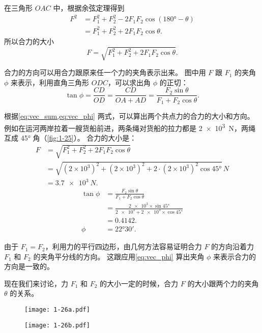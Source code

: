 在三角形 $OAC$ 中，根据余弦定理得到
\[\begin{split}
F^2 & = F_1^2+F_2^2-2F_1F_2\cos(\ang{180} -\theta)  \\
&= F_1^2+F_2^2+2F_1F_2\cos\theta.
\end{split} \]
所以合力的大小
\begin{equation}
  \label{eq:vec_sum}
F=\sqrt{F_1^2+F_2^2+2F_1F_2\cos\theta}.
\end{equation}

合力的方向可以用合力跟原来任一个力的夹角表示出来。
图中用 $F$ 跟 $F_1$ 的夹角 $\phi$ 来表示，利用直角三角形 $ODC$，可以求出角 $\phi$ 的正切：
\begin{equation}
  \label{eq:vec_phi}
\tan\phi =\frac{CD}{OD}=\frac{CD}{OA+AD}=\frac{F_2\sin\theta }{F_1+F_2\cos\theta}.
\end{equation}

根据\cref{eq:vec_sum,eq:vec_phi} 两式，可以算出两个共点力的合力的大小和方向。
例如在运河两岸拉着一艘货船前进，两条绳对货船的拉力都是 \qty{2e3}{N}，两绳互成 \ang{45} 角（\cref{fig:1-25}）。
合力的大小是：
\[\begin{split}
F&= \sqrt{F_1^2+F_2^2+2F_1F_2\cos\theta}\\
&=\sqrt{(2\times 10^3)^2+(2\times 10^3)^2+2\cdot(2\times 10^3)^2\cos \ang{45}}\,\unit{N}\\
&=\qty{3.7e3}{N}.
\end{split} \]
\[\begin{split}
\tan\phi&= \frac{F_2\sin\theta }{F_1+F_2\cos\theta}\\
&= \frac{\num{2e3} \times \sin\ang{45}}{\num{2e3}+\num{2e3}\times \cos\ang{45}}  \\
&=0.4142.\\
\phi &= \ang{22;30;}.
\end{split} \]


由于 $F_1=F_2$，利用力的平行四边形，由几何方法容易证明合力 $F$ 的方向沿着力 $F_1$ 和 $F_2$ 的夹角平分线的方向。
这跟应用\cref{eq:vec_phi} 算出夹角 $\phi$ 来表示合力的方向是一致的。

现在我们来讨论，力 $F_1$ 和 $F_2$ 的大小一定的时候，合力 $F$ 的大小跟两个力的夹角 $\theta$ 的关系。

\begin{figure}
  \begin{minipage}{0.4\linewidth}\centering
    \texttt{[image: 1-26a.pdf]}
    \subcaption{}\label{fig:1-26a}
  \end{minipage}
  \begin{minipage}{0.4\linewidth}\centering
    \texttt{[image: 1-26b.pdf]}
    \subcaption{}\label{fig:1-26b}
  \end{minipage}
\caption{}\label{fig:1-26}
\end{figure}

